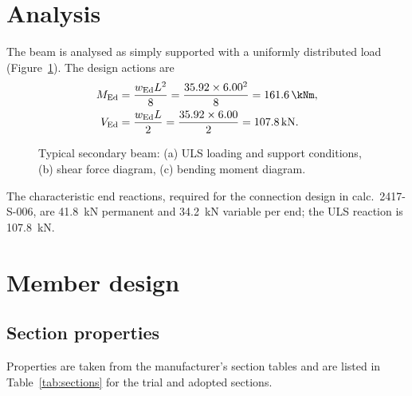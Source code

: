 \documentclass[11pt,a4paper]{article}
\begin{document}
\section{Analysis}
\label{sec:analysis}

The beam is analysed as simply supported with a uniformly distributed load (Figure~\ref{fig:beam}). The design actions are
\begin{align}
  M_{\text{Ed}} &= \frac{w_{\text{Ed}} L^2}{8} = \frac{35.92 \times 6.00^2}{8} = \qty{161.6}{\kNm}, \\
  V_{\text{Ed}} &= \frac{w_{\text{Ed}} L}{2} = \frac{35.92 \times 6.00}{2} = \qty{107.8}{\kN}.
\end{align}

\begin{figure}[H]
  \centering
  
  \caption{Typical secondary beam: (a) ULS loading and support conditions, (b) shear force diagram, (c) bending moment diagram.}
  \label{fig:beam}
\end{figure}

The characteristic end reactions, required for the connection design in calc.\ 2417-S-006, are \qty{41.8}{\kN} permanent and \qty{34.2}{\kN} variable per end; the ULS reaction is \qty{107.8}{\kN}.

\section{Member design}
\label{sec:design}

\subsection{Section properties}

Properties are taken from the manufacturer's section tables and are listed in Table~\ref{tab:sections} for the trial and adopted sections.
\end{document}
